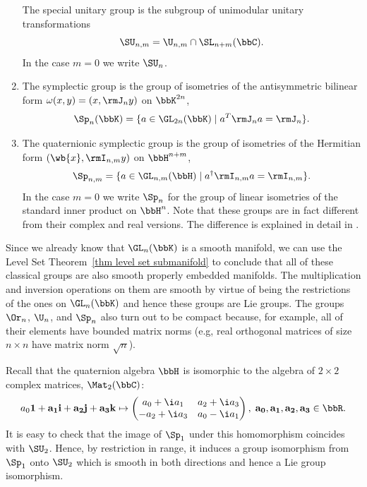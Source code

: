\begin{example}
\begin{enumerate}
        The special unitary group is the subgroup of unimodular unitary transformations
        \[\SU_{n,m}=\U_{n,m}\cap \SL_{n+m}(\bbC).\]
        In the case $m=0$ we write $\SU_n$.
        \item The symplectic group is the group of isometries of the antisymmetric bilinear form $\omega(x,y)=(x,\rmJ_n y)$ on $\bbK^{2n}$,
        \[\Sp_n(\bbK)=\{a\in\GL_{2n}(\bbK)\mid a^T \rmJ_n a=\rmJ_n\}.\]
        \item The quaternionic symplectic group is the group of isometries of the Hermitian form $(\wb{x},\rmI_{n,m}y)$ on $\bbH^{n+m}$,
        \[\Sp_{n,m}=\{a\in\GL_{n,m}(\bbH)\mid a^\dagger \rmI_{n,m}a=\rmI_{n,m}\}.\]
        In the case $m=0$ we write $\Sp_n$ for the group of linear isometries of the standard inner product on $\bbH^n$. Note that these groups are in fact different from their complex and real versions. The difference is explained in detail in \cite[pp.~5-6]{Sepanski}.
    \end{enumerate}
\end{example}

Since we already know that $\GL_n(\bbK)$ is a smooth manifold, we can use the Level Set Theorem~\ref{thm level set submanifold} to conclude that all of these classical groups are also smooth properly embedded manifolds. The multiplication and inversion operations on them are smooth by virtue of being the restrictions of the ones on $\GL_n(\bbK)$ and hence these groups are Lie groups. The groups $\Or_n$, $\U_n$, and $\Sp_n$ also turn out to be compact because, for example, all of their elements have bounded matrix norms (e.g, real orthogonal matrices of size $n\times n$ have matrix norm $\sqrt{n}$).


\begin{example}[$\SU_2\cong \Sp_1$]
    Recall that the quaternion algebra $\bbH$ is isomorphic to the algebra of $2\times 2$ complex matrices, $\Mat_2(\bbC)$:
    \[a_0 \bf{1}+a_1 \bf{i}+a_2 \bf{j}+a_3 \bf{k}\mapsto
    \begin{pmatrix}
        a_0+\i a_1&a_2+\i a_3\\
        -a_2+\i a_3&a_0-\i a_1
    \end{pmatrix}, \; a_0,a_1,a_2,a_3\in\bbR.\label{46939}
    \]
    It is easy to check that the image of $\Sp_1$ under this homomorphism coincides with $\SU_2$. Hence, by restriction in range, it induces a group isomorphism from $\Sp_1$ onto $\SU_2$ which is smooth in both directions and hence a Lie group isomorphism.
\end{example}

